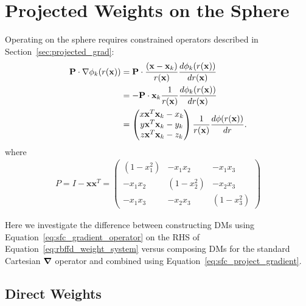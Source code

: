 %
% 
%
%


\chapter{Projected Weights on the Sphere} 
\label{app:indirect_weights}

Operating on the sphere requires constrained operators described in Section~\ref{sec:projected_grad}:
\begin{align}
\mathbf{P} \cdot \nabla \phi_{k}(r(\vx)) & = \mathbf{P} \cdot \frac{(\vx-\vx_{k})}{r(\vx)} \d{\phi_{k}(r(\vx))}{r(\vx)}  \nonumber \\
& = -\mathbf{P} \cdot \vx_{k}\frac{1}{r(\vx)} \d{\phi_{k}(r(\vx))}{r(\vx)}  \nonumber \\ %
& = \begin{pmatrix} x \vx^{T} \vx_{k} - x_{k} \\  y \vx^{T} \vx_{k} - y_{k} \\  z \vx^{T} \vx_{k} - z_{k} \end{pmatrix} \frac{1}{r(\vx)} \d{\phi(r(\vx))}{r} \label{eq:sfc_gradient_operator}.
\end{align}
where 
\begin{align}
P = I - \mathbf{x} \mathbf{x}^T =  \begin{pmatrix} 
(1-x_1^2) & -x_1 x_2 & -x_1 x_3 \\
-x_1 x_2 & (1-x_2^2) & -x_2 x_3 \\ 
-x_1 x_3 & -x_2 x_3 & (1-x_3^2) 
\end{pmatrix} 
\label{eq:sfc_project_gradient}
\end{align}

Here we investigate the difference between constructing DMs using Equation~\ref{eq:sfc_gradient_operator} on the RHS of Equation~\ref{eq:rbffd_weight_system} versus composing DMs for the standard Cartesian $\grad$ operator and combined using Equation~\ref{eq:sfc_project_gradient}.


\section{Direct Weights} 

